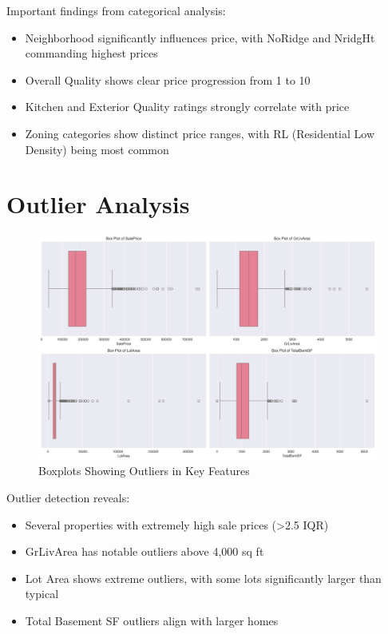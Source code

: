 Important findings from categorical analysis:
\begin{itemize}
    \item Neighborhood significantly influences price, with NoRidge and NridgHt commanding highest prices
    \item Overall Quality shows clear price progression from 1 to 10
    \item Kitchen and Exterior Quality ratings strongly correlate with price
    \item Zoning categories show distinct price ranges, with RL (Residential Low Density) being most common
\end{itemize}

\section{Outlier Analysis}
\begin{figure}[H]
    \centering
    \includegraphics[width=1.0\textwidth]{figures/outliers_boxplot.png}
    \caption{Boxplots Showing Outliers in Key Features}
    \label{fig:outliers}
\end{figure}

Outlier detection reveals:
\begin{itemize}
    \item Several properties with extremely high sale prices (>2.5 IQR)
    \item GrLivArea has notable outliers above 4,000 sq ft
    \item Lot Area shows extreme outliers, with some lots significantly larger than typical
    \item Total Basement SF outliers align with larger homes
\end{itemize}

